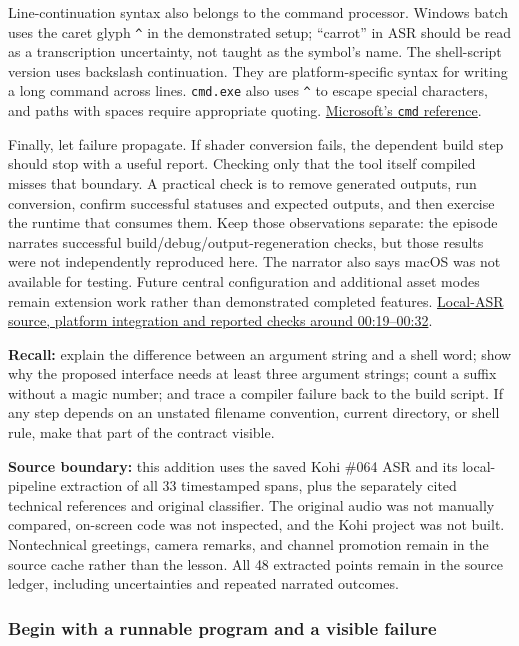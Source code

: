 Line-continuation syntax also belongs to the command processor. Windows batch uses the caret glyph \texttt{\^{}} in the demonstrated setup; ``carrot'' in ASR should be read as a transcription uncertainty, not taught as the symbol's name. The shell-script version uses backslash continuation. They are platform-specific syntax for writing a long command across lines. \texttt{cmd.exe} also uses \texttt{\^{}} to escape special characters, and paths with spaces require appropriate quoting. \href{https://learn.microsoft.com/en-us/windows-server/administration/windows-commands/cmd}{Microsoft's \texttt{cmd} reference}.

Finally, let failure propagate. If shader conversion fails, the dependent build step should stop with a useful report. Checking only that the tool itself compiled misses that boundary. A practical check is to remove generated outputs, run conversion, confirm successful statuses and expected outputs, and then exercise the runtime that consumes them. Keep those observations separate: the episode narrates successful build/debug/output-regeneration checks, but those results were not independently reproduced here. The narrator also says macOS was not available for testing. Future central configuration and additional asset modes remain extension work rather than demonstrated completed features. \href{https://www.youtube.com/watch?v=cCEmwjfHIkY&t=1167}{Local-ASR source, platform integration and reported checks around 00:19--00:32}.

\textbf{Recall:} explain the difference between an argument string and a shell word; show why the proposed interface needs at least three argument strings; count a suffix without a magic number; and trace a compiler failure back to the build script. If any step depends on an unstated filename convention, current directory, or shell rule, make that part of the contract visible.

\textbf{Source boundary:} this addition uses the saved Kohi \#064 ASR and its local-pipeline extraction of all 33 timestamped spans, plus the separately cited technical references and original classifier. The original audio was not manually compared, on-screen code was not inspected, and the Kohi project was not built. Nontechnical greetings, camera remarks, and channel promotion remain in the source cache rather than the lesson. All 48 extracted points remain in the source ledger, including uncertainties and repeated narrated outcomes.

\subsubsection{Begin with a runnable program and a visible failure}\label{begin-with-a-runnable-program-and-a-visible-failure}

